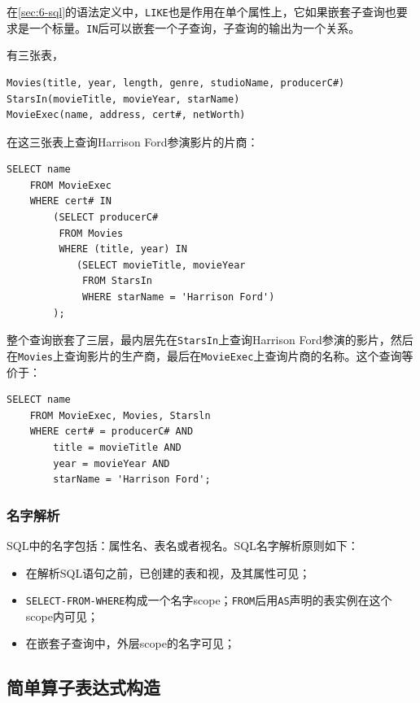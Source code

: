 在\ref{sec:6-sql}的语法定义中，\texttt{LIKE}也是作用在单个属性上，它如果嵌套子查询也要求是一个标量。\texttt{IN}后可以嵌套一个子查询，子查询的输出为一个关系。

\begin{example}
    有三张表，
\begin{lstlisting}[style=verbose]
Movies(title, year, length, genre, studioName, producerC#)
StarsIn(movieTitle, movieYear, starName)
MovieExec(name, address, cert#, netWorth)
\end{lstlisting}

在这三张表上查询Harrison Ford参演影片的片商：
\begin{lstlisting}[style=verbose]
    SELECT name
    FROM MovieExec
    WHERE cert# IN
        (SELECT producerC#
         FROM Movies
         WHERE (title, year) IN
            (SELECT movieTitle, movieYear
             FROM StarsIn
             WHERE starName = 'Harrison Ford')
        );
\end{lstlisting}

整个查询嵌套了三层，最内层先在\texttt{StarsIn}上查询Harrison Ford参演的影片，然后在\texttt{Movies}上查询影片的生产商，最后在\texttt{MovieExec}上查询片商的名称。这个查询等价于：
\begin{lstlisting}[style=verbose]
    SELECT name
    FROM MovieExec, Movies, Starsln
    WHERE cert# = producerC# AND
        title = movieTitle AND
        year = movieYear AND
        starName = 'Harrison Ford';
\end{lstlisting}
\end{example}

\subsubsection*{名字解析}

SQL中的名字包括：属性名、表名或者视名。SQL名字解析原则如下：
\begin{itemize}
    \item 在解析SQL语句之前，已创建的表和视，及其属性可见；
    \item \texttt{SELECT-FROM-WHERE}构成一个名字scope；\texttt{FROM}后用\texttt{AS}声明的表实例在这个scope内可见；
    \item 在嵌套子查询中，外层scope的名字可见；
\end{itemize}

\subsection{简单算子表达式构造} \label{sec:6-convert-relation-exp}

